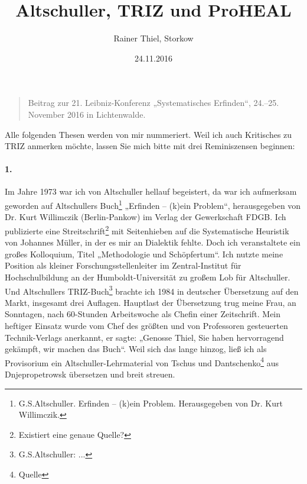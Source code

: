 \documentclass[12pt,a4paper]{article}
\title{Altschuller, TRIZ und ProHEAL}
\author{Rainer Thiel, Storkow}
\date{24.11.2016}
\begin{document}
\maketitle
\begin{quote}
  Beitrag zur 21. Leibniz-Konferenz „Systematisches Erfinden“,
  24.--25. November 2016 in Lichtenwalde.
\end{quote}

Alle folgenden Thesen werden von mir nummeriert. Weil ich auch Kritisches zu
TRIZ anmerken möchte, lassen Sie mich bitte mit drei Reminiszensen beginnen:

\paragraph{1.}
Im Jahre 1973 war ich von Altschuller hellauf begeistert, da war ich
aufmerksam geworden auf Altschullers Buch\footnote{G.S.Altschuller. Erfinden –
  (k)ein Problem. Herausgegeben von Dr. Kurt Willimczik. } „Erfinden – (k)ein
Problem“, herausgegeben von Dr. Kurt Willimczik (Berlin-Pankow) im Verlag der
Gewerkschaft FDGB. Ich publizierte eine Streitschrift\footnote{Existiert eine
  genaue Quelle?} mit Seitenhieben auf die Systematische Heuristik von
Johannes Müller, in der es mir an Dialektik fehlte. Doch ich veranstaltete ein
großes Kolloquium, Titel „Methodologie und Schöpfertum“. Ich nutzte meine
Position als kleiner Forschungsstellenleiter im Zentral-Institut für
Hochschulbildung an der Humboldt-Universität zu großem Lob für Altschuller.
Und Altschullers TRIZ-Buch\footnote{G.S.Altschuller: ... } brachte ich 1984 in
deutscher Übersetzung auf den Markt, insgesamt drei Auflagen. Hauptlast der
Übersetzung trug meine Frau, an Sonntagen, nach 60-Stunden Arbeitswoche als
Chefin einer Zeitschrift. Mein heftiger Einsatz wurde vom Chef des größten und
von Professoren gesteuerten Technik-Verlags anerkannt, er sagte: „Genosse
Thiel, Sie haben hervorragend gekämpft, wir machen das Buch“. Weil sich das
lange hinzog, ließ ich als Provisorium ein Altschuller-Lehrmaterial von Tschus
und Dantschenko\footnote{Quelle} aus Dnjepropetrowsk übersetzen und breit
streuen.
\end{document}
